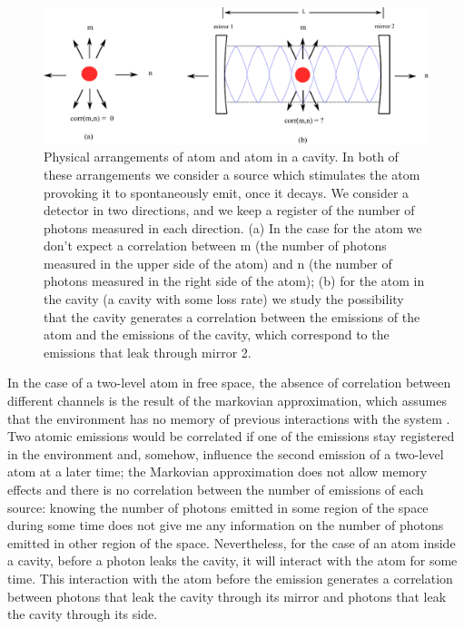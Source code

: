 \documentclass[conference]{IEEEtran}
\begin{document}
\begin{center}
\begin{figure}\label{asa}
\begin{center}
\includegraphics[scale = 0.65]{newimagepaper.pdf}
\caption{\small{Physical arrangements of atom and atom in a cavity. In
    both of these arrangements we consider a source which stimulates
    the atom provoking it to spontaneously emit, once it decays. We
    consider a detector in two directions, and we keep a register of
    the number of photons measured in each direction. (a) In the case
    for the atom we don't expect a correlation between m (the number
    of photons measured in the upper side of the atom) and n (the
    number of photons measured in the right side of the atom); (b) for
    the atom in the cavity (a cavity with some loss rate) we study the
    possibility that the cavity generates a correlation between the
    emissions of the atom and the emissions of the cavity, which
    correspond to the emissions that leak through mirror
    2.}} \label{probdisult}
\end{center}
\end{figure}
\end{center}


In the case of a two-level atom in free space, the absence of
correlation between different channels is the result of the markovian
approximation, which assumes that the environment has no memory of
previous interactions with the system \cite{daley2014quantum}. Two
atomic emissions would be correlated if one of the emissions stay
registered in the environment and, somehow, influence the second
emission of a two-level atom at a later time; the Markovian
approximation does not allow memory effects and there is no
correlation between the number of emissions of each source: knowing
the number of photons emitted in some region of the space during some
time does not give me any information on the number of photons emitted
in other region of the space. Nevertheless, for the case of an atom
inside a cavity, before a photon leaks the cavity, it will interact
with the atom for some time. This interaction with the atom before the
emission generates a correlation between photons that leak the cavity
through its mirror and photons that leak the cavity through its side.
\end{document}
